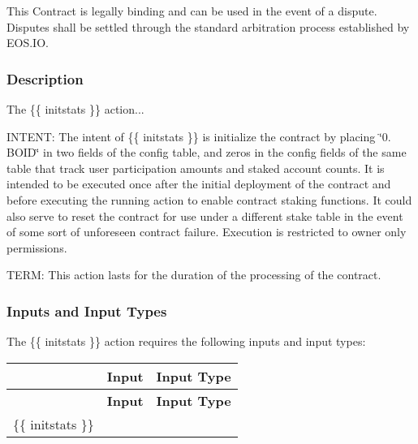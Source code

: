This Contract is legally binding and can be used in the event of a dispute. Disputes shall be settled through the standard arbitration process established by E\+O\+S.\+IO.

\subsubsection*{Description}

The {\ttfamily \{\{ initstats \}\}} action...

I\+N\+T\+E\+NT\+: The intent of {\ttfamily \{\{ initstats \}\}} is initialize the contract by placing \char`\"{}0. B\+O\+I\+D\char`\"{} in two fields of the config table, and zeros in the config fields of the same table that track user participation amounts and staked account counts. It is intended to be executed once after the initial deployment of the contract and before executing the running action to enable contract staking functions. It could also serve to reset the contract for use under a different stake table in the event of some sort of unforeseen contract failure. Execution is restricted to owner only permissions.

T\+E\+RM\+: This action lasts for the duration of the processing of the contract.

\subsubsection*{Inputs and Input Types}

The {\ttfamily \{\{ initstats \}\}} action requires the following {\ttfamily inputs} and {\ttfamily input types}\+:

\tabulinesep=1mm
\begin{longtabu} spread 0pt [c]{*3{|X[-1]}|}
\hline
{}&{\bf Input }&{\bf Input Type  }\\
\endfirsthead
\hline
\endfoot
\hline
{}&{\bf Input }&{\bf Input Type  }\\
\endhead
{\ttfamily \{\{ initstats \}\}} &&\\
\end{longtabu}
